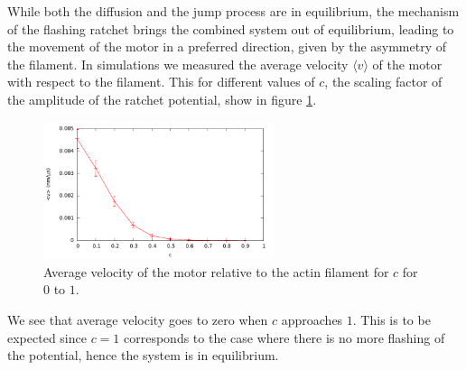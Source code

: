 \documentclass[aps,pre,onecolumn,showpacs,showkeys,a4paper]{revtex4}
\begin{document}
While both the diffusion and the jump process are in equilibrium, the mechanism of the flashing ratchet brings the combined system out of equilibrium, leading to the movement of the motor in a preferred direction, given by the asymmetry of the filament. 
In simulations we measured the average velocity $\langle v\rangle$ of the motor with respect to the filament. 
This for different values of $c$, the scaling factor of the amplitude of the ratchet potential, show in figure \ref{Fig: c_v}.
\begin{figure}[h]
\centering
\includegraphics[width=0.6\textwidth,height=!]{c_v_4heads}
\caption{Average velocity of the motor relative to the actin filament for $c$ for $0$ to $1$.} 
\label{Fig: c_v}
\end{figure}
We see that average velocity goes to zero when $c$ approaches $1$. 
This is to be expected since $c=1$ corresponds to the case where there is no more flashing of the potential, hence the system is in equilibrium.
\end{document}
